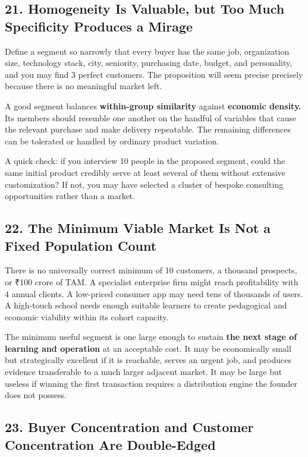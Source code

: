 \subsection*{21. Homogeneity Is Valuable, but Too Much Specificity Produces a Mirage}

Define a segment so narrowly that every buyer has the same job, organization size, technology stack, city, seniority, purchasing date, budget, and personality, and you may find 3 perfect customers. The proposition will seem precise precisely because there is no meaningful market left.

A good segment balances \textbf{within-group similarity} against \textbf{economic density.} Its members should resemble one another on the handful of variables that cause the relevant purchase and make delivery repeatable. The remaining differences can be tolerated or handled by ordinary product variation.

A quick check: if you interview 10 people in the proposed segment, could the same initial product credibly serve at least several of them without extensive customization? If not, you may have selected a cluster of bespoke consulting opportunities rather than a market.

\subsection*{22. The Minimum Viable Market Is Not a Fixed Population Count}

There is no universally correct minimum of 10 customers, a thousand prospects, or ₹100 crore of TAM. A specialist enterprise firm might reach profitability with 4 annual clients. A low-priced consumer app may need tens of thousands of users. A high-touch school needs enough suitable learners to create pedagogical and economic viability within its cohort capacity.

The minimum useful segment is one large enough to sustain \textbf{the next stage of learning and operation} at an acceptable cost. It may be economically small but strategically excellent if it is reachable, serves an urgent job, and produces evidence transferable to a much larger adjacent market. It may be large but useless if winning the first transaction requires a distribution engine the founder does not possess.

\subsection*{23. Buyer Concentration and Customer Concentration Are Double-Edged}

